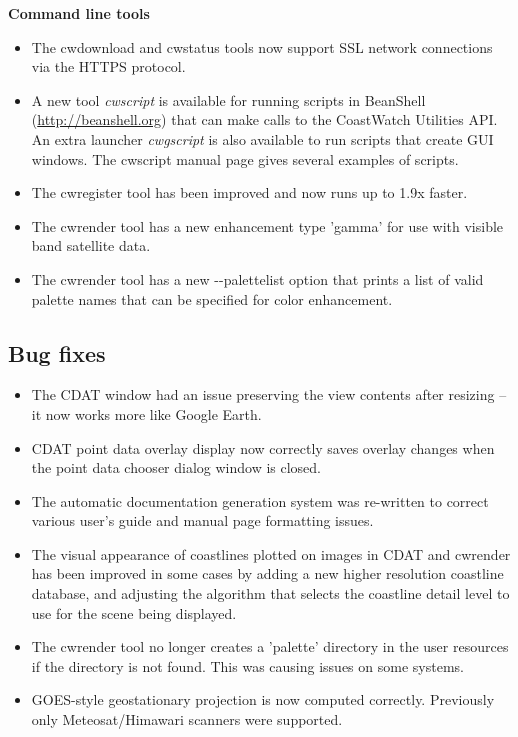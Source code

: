 \hspace{0.4cm} {\bf Command line tools}
\begin{itemize}

    \item The cwdownload and cwstatus tools now support SSL network connections
    via the HTTPS protocol.

    \item A new tool {\em cwscript} is available for running scripts in
    BeanShell (\url{http://beanshell.org}) that can make calls to the
    CoastWatch Utilities API.  An extra launcher {\em cwgscript}
    is also available to run scripts that create GUI windows.  The cwscript
    manual page gives several examples of scripts.

    \item The cwregister tool has been improved and now runs up to 1.9x faster.

    \item The cwrender tool has a new enhancement type 'gamma' for use with
    visible band satellite data.

    \item The cwrender tool has a new -{-}palettelist option that prints a list
    of valid palette names that can be specified for color enhancement.

\end{itemize}

\subsection*{ Bug fixes}
\begin{itemize}

  \item The CDAT window had an issue preserving the view contents after
  resizing -- it now works more like Google Earth.

  \item CDAT point data overlay display now correctly saves overlay changes
  when the point data chooser dialog window is closed.

  \item The automatic documentation generation system was re-written to
  correct various user's guide and manual page formatting issues.

  \item The visual appearance of coastlines plotted on images in CDAT and
  cwrender has been improved in some cases by adding a new higher
  resolution coastline database, and adjusting the algorithm that selects
  the coastline detail level to use for the scene being displayed.

  \item The cwrender tool no longer creates a 'palette' directory in the
  user resources if the directory is not found.  This was causing issues
  on some systems.

  \item GOES-style geostationary projection is now computed correctly.
  Previously only Meteosat/Himawari scanners were supported.

\end{itemize}

